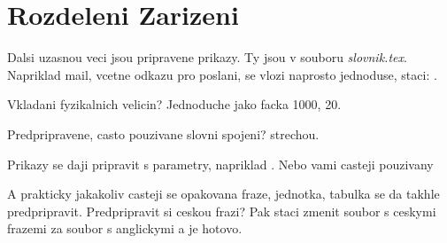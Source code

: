 \section{Rozdeleni Zarizeni}

Dalsi uzasnou veci jsou pripravene prikazy. Ty jsou v souboru
\textit{slovnik.tex}. Napriklad mail, vcetne odkazu pro poslani, se vlozi
naprosto jednoduse, staci: \mail.

Vkladani fyzikalnich velicin? Jednoduche jako facka 1000\mh, 20\gc.

Predpripravene, casto pouzivane slovni spojeni? \soucProstTepla strechou.

Prikazy se daji pripravit s parametry, napriklad . Nebo
vami casteji pouzivany 

A prakticky jakakoliv casteji se opakovana fraze, jednotka, tabulka se da takhle
predpripravit. Predpripravit si ceskou frazi? Pak staci zmenit soubor s ceskymi
frazemi za soubor s anglickymi a je hotovo.
